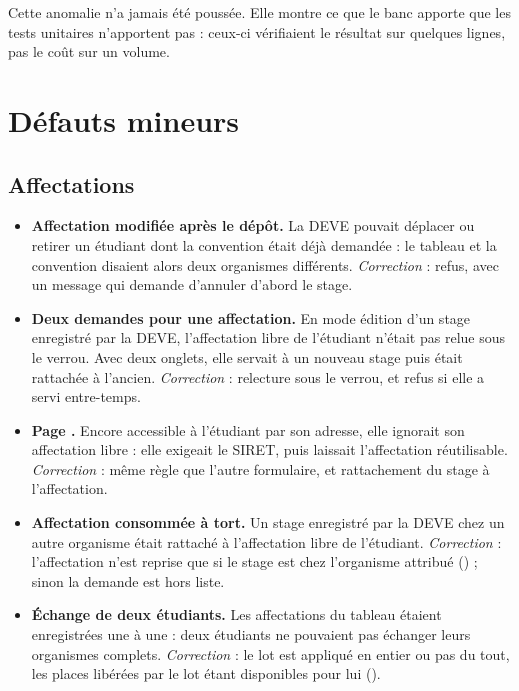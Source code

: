 \documentclass[11pt,a4paper]{article}
\newcommand{\grav}[1]{\textbf{\textcolor{#1}{\textbullet}}}
\newcommand{\mineure}{\grav{gray}}
\begin{document}
Cette anomalie n'a jamais été poussée. Elle montre ce que le banc apporte que les tests unitaires
n'apportent pas : ceux-ci vérifiaient le résultat sur quelques lignes, pas le coût sur un volume.

\section{Défauts mineurs}

\subsection{Affectations}

\begin{itemize}
  \item[\mineure] \textbf{Affectation modifiée après le dépôt.} La DEVE pouvait déplacer ou
    retirer un étudiant dont la convention était déjà demandée : le tableau et la convention
    disaient alors deux organismes différents. \emph{Correction} : refus, avec un message qui
    demande d'annuler d'abord le stage.
  \item[\mineure] \textbf{Deux demandes pour une affectation.} En mode édition d'un stage
    enregistré par la DEVE, l'affectation libre de l'étudiant n'était pas relue sous le verrou. Avec
    deux onglets, elle servait à un nouveau stage puis était rattachée à l'ancien.
    \emph{Correction} : relecture sous le verrou, et refus si elle a servi entre-temps.
  \item[\mineure] \textbf{Page .} Encore accessible à l'étudiant par
    son adresse, elle ignorait son affectation libre : elle exigeait le SIRET, puis laissait
    l'affectation réutilisable. \emph{Correction} : même règle que l'autre formulaire, et
    rattachement du stage à l'affectation.
  \item[\mineure] \textbf{Affectation consommée à tort.} Un stage enregistré par la DEVE chez un
    autre organisme était rattaché à l'affectation libre de l'étudiant. \emph{Correction} :
    l'affectation n'est reprise que si le stage est chez l'organisme attribué
    () ; sinon la demande est hors liste.
  \item[\mineure] \textbf{Échange de deux étudiants.} Les affectations du tableau étaient
    enregistrées une à une : deux étudiants ne pouvaient pas échanger leurs organismes complets.
    \emph{Correction} : le lot est appliqué en entier ou pas du tout, les places libérées par le
    lot étant disponibles pour lui ().
\end{itemize}
\end{document}
